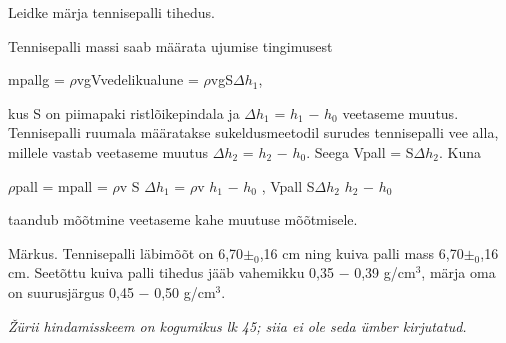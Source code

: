 
Leidke märja tennisepalli tihedus.

\hint

\solu
Tennisepalli massi saab määrata ujumise tingimusest

mpallg = $\rho$vgVvedelikualune = $\rho$vgS$\Delta$$h_1$,

kus S on piimapaki ristlõikepindala ja $\Delta$$h_1$ = $h_1$ $-$ $h_0$ veetaseme muutus. Tennisepalli ruumala määratakse sukeldusmeetodil surudes tennisepalli vee alla, millele vastab veetaseme muutus $\Delta$$h_2$ = $h_2$ $-$ $h_0$. Seega Vpall = S$\Delta$$h_2$. Kuna

$\rho$pall = mpall = $\rho$v S $\Delta$$h_1$ = $\rho$v $h_1$ $-$ $h_0$ , Vpall S$\Delta$$h_2$ $h_2$ $-$ $h_0$

taandub mõõtmine veetaseme kahe muutuse mõõtmisele.

Märkus. Tennisepalli läbimõõt on 6,70$\pm_0$,16 cm ning kuiva palli mass 6,70$\pm_0$,16 cm. Seetõttu kuiva palli tihedus jääb vahemikku 0,35 $-$ 0,39 g/cm$^3$, märja oma on suurusjärgus 0,45 $-$ 0,50 g/cm$^3$.

\textit{Žürii hindamisskeem on kogumikus lk 45; siia ei ole seda ümber kirjutatud.}
\probend

